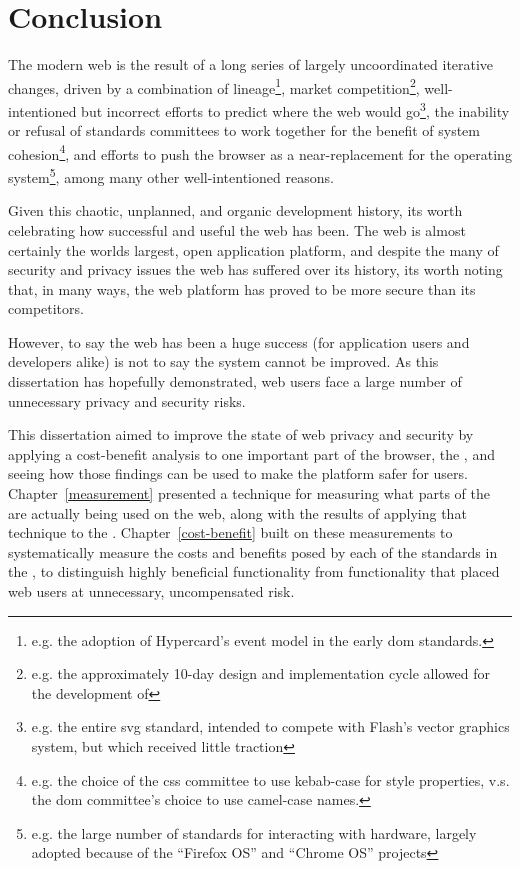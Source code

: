 \chapter{Conclusion}
\label{conclusion}

The modern web is the result of a long series of largely uncoordinated
iterative changes, driven by a combination of lineage\footnote{e.g. the
adoption of Hypercard's event model in the early \gls{dom} standards.}, market
competition\footnote{e.g. the approximately 10-day design and implementation
cycle allowed for the development of \JS}, well-intentioned but incorrect
efforts to predict where the web would go\footnote{e.g. the entire \gls{svg}
\WAPI standard, intended to compete with Flash's vector graphics system, but
which received little traction}, the inability or refusal of standards
committees to work together for the benefit of system cohesion\footnote{e.g.
the choice of the \gls{css} committee to use kebab-case for style properties,
v.s.  the \gls{dom} committee's choice to use camel-case names.}, and efforts
to push the browser as a near-replacement for the operating
system\footnote{e.g. the large number of \WAPI standards for interacting with
hardware, largely adopted because of the ``Firefox OS'' and ``Chrome OS''
projects}, among many other well-intentioned reasons.

Given this chaotic, unplanned, and organic development history, its worth
celebrating how successful and useful the web has been.  The web is almost
certainly the worlds largest, open application platform, and despite the many
of security and privacy issues the web has suffered over its history, its worth
noting that, in many ways, the web platform has proved to be more secure than
its competitors.

However, to say the web has been a huge success (for application users and
developers alike) is not to say the system cannot be improved.  As this
dissertation has hopefully demonstrated, web users face a large number of
unnecessary privacy and security risks.

This dissertation aimed to improve the state of web privacy and security
by applying a cost-benefit analysis to one important part of the browser,
the \WAPI, and seeing how those findings can be used to make the platform
safer for users.  Chapter~\ref{measurement} presented a technique for measuring
what parts of the \WAPI are actually being used on the web, along with the
results of applying that technique to the \ATK.  Chapter~\ref{cost-benefit}
built on these measurements to systematically measure the costs and benefits
posed by each of the standards in the \WAPI, to distinguish
highly beneficial functionality from functionality that placed web users
at unnecessary, uncompensated risk.

